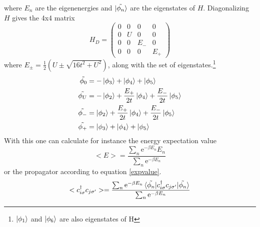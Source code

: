 where $E_n$ are the eigenenergies and $\ket{\tilde{\phi_n}}$ are the eigenstates of $H$. Diagonalizing $H$ gives the 4x4 matrix 
\begin{equation*}
H_D=
\begin{pmatrix}
0 & 0 & 0&0\\
0 & U & 0&0\\
0 & 0 & E_{-}&0\\
0 & 0 & 0&E_{+}
\end{pmatrix}
\end{equation*}
where $E_{\pm}=\frac{1}{2}(U\pm\sqrt{16t^2+U^2})$, along with the set of eigenstates.\footnote{$\ket{\phi_1}$ and $\ket{\phi_6}$ are also eigenstates of H}
\begin{align*}
	\tilde{\phi_{0}}&=-\ket{\phi_3}+\ket{\phi_4}+\ket{\phi_5}\\
	\tilde{\phi_{U}}&=-\ket{\phi_2}+\frac{E_+}{2t}\ket{\phi_4}+\frac{E_-}{2t}\ket{\phi_5}	\\
	\tilde{\phi_{-}}&=\ket{\phi_2}+\frac{E_+}{2t}\ket{\phi_4}+\frac{E_-}{2t}\ket{\phi_5}	\\
	\tilde{\phi_{+}}&=\ket{\phi_3}+\ket{\phi_4}+\ket{\phi_5}	
\end{align*}
With this one can calculate for instance the energy expectation value 
\begin{equation}
	<E>   = \frac{\sum_{n}^{}\text{e}^{-\beta E_n}E_n}{\sum_{n}^{}\text{e}^{-\beta E_n}}
\end{equation}
or the propagator according to equation \ref{expvalue}.
\begin{equation}
	<c^{\dagger}_{i\sigma}c_{j\sigma^{\prime}}>= \frac{\sum_{n}^{}\text{e}^{-\beta E_n}\braket{\tilde{\phi_n}|c^{\dagger}_{i\sigma}c_{j\sigma^{\prime}}|\tilde{\phi_n}}}{\sum_{n}^{}\text{e}^{-\beta E_n}}
\end{equation}


